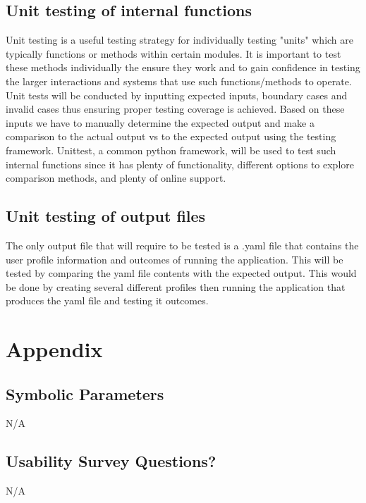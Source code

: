 \documentclass[12pt, titlepage]{article}
\begin{document}
		
\subsection{Unit testing of internal functions}
Unit testing is a useful testing strategy for individually testing "units" which are typically functions or methods within certain modules. It is important to test these methods individually the ensure they work and to gain confidence in testing the larger interactions and systems that use such functions/methods to operate. 
Unit tests will be conducted by inputting expected inputs, boundary cases and invalid cases thus ensuring proper testing coverage is achieved. Based on these inputs we have to manually determine the expected output and make a comparison to the actual output vs to the expected output using the testing framework. Unittest, a common python framework, will be used to test such internal functions since it has plenty of functionality, different options to explore comparison methods, and plenty of online support. 
\subsection{Unit testing of output files}
The only output file that will require to be tested is a .yaml file that contains the user profile information and outcomes of running the application. This will be tested by comparing the yaml file contents with the expected output. This would be done by creating several different profiles then running the application that produces the yaml file and testing it outcomes.

%

%

\newpage

\section{Appendix}

\subsection{Symbolic Parameters}

N/A

\subsection{Usability Survey Questions?}

N/A
\end{document}
